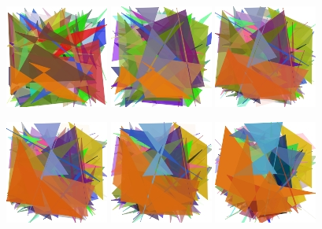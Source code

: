 \documentclass[11pt, spanish]{article}
\begin{document}
\begin{figure}[htp]
  \centering
  \includegraphics{media/paralell0.jpg}
  \includegraphics{media/paralell13.jpg}
  \includegraphics{media/paralell62.jpg}
\end{figure}
\begin{figure}[htp]
  \centering
  \includegraphics{media/paralell83.jpg}
  \includegraphics{media/paralell111.jpg}
  \includegraphics{media/paralell188.jpg}
\end{figure}
\end{document}
